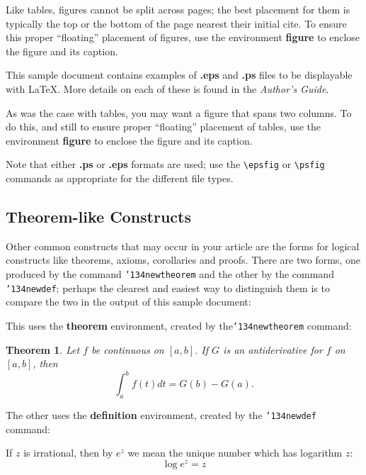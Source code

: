 \documentclass{acm_proc_article-sp}
\begin{document}
Like tables, figures cannot be split across pages; the best placement
for them is typically the top or the bottom of the page nearest their
initial cite.  To ensure this proper ``floating'' placement of figures,
use the environment \textbf{figure} to enclose the figure and its caption.

This sample document contains examples of \textbf{.eps}
and \textbf{.ps} files to be displayable with \LaTeX{}.  More
details on each of these is found in the \emph{Author's Guide}.



As was the case with tables, you may want a figure
that spans two columns.  To do this, and still to
ensure proper ``floating'' placement of tables, use the environment
\textbf{figure\*} to enclose the figure and its caption.

Note that either \textbf{.ps} or \textbf{.eps} formats are used; use the \texttt{\textbackslash{}epsfig}
or \texttt{\textbackslash{}psfig} commands as appropriate for the different file types.
\subsection{Theorem-like Constructs}
\label{sec-3-6}

Other common constructs that may occur in your article are
the forms for logical constructs like theorems, axioms,
corollaries and proofs.  There are
two forms, one produced by the
command \texttt{{\char'134}newtheorem} and the
other by the command \texttt{{\char'134}newdef}; perhaps
the clearest and easiest way to distinguish them is
to compare the two in the output of this sample document:

This uses the \textbf{theorem} environment, created by
the\linebreak\texttt{{\char'134}newtheorem} command:
\newtheorem{theorem}{Theorem}
\begin{theorem}
Let $f$ be continuous on $[a,b]$.  If $G$ is
an antiderivative for $f$ on $[a,b]$, then
\begin{displaymath}\int^b_af(t)dt = G(b) - G(a).\end{displaymath}
\end{theorem}

The other uses the \textbf{definition} environment, created
by the \texttt{{\char'134}newdef} command:
\begin{definition}
If $z$ is irrational, then by $e^z$ we mean the
unique number which has
logarithm $z$: \begin{displaymath}{\log e^z = z}\end{displaymath}
\end{definition}
\end{document}
